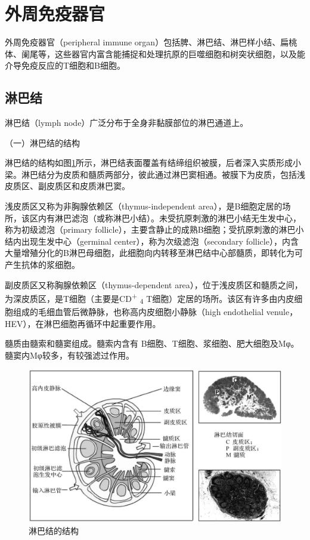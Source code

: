 \section{外周免疫器官}

外周免疫器官（peripheral immune
organ）包括脾、淋巴结、淋巴样小结、扁桃体、阑尾等，这些器官内富含能捕捉和处理抗原的巨噬细胞和树突状细胞，以及能介导免疫反应的T细胞和B细胞。


\subsection{淋巴结}

淋巴结（lymph node）广泛分布于全身非黏膜部位的淋巴通道上。

（一）淋巴结的结构

淋巴结的结构如图\ref{fig2-8}所示，淋巴结表面覆盖有结缔组织被膜，后者深入实质形成小梁。淋巴结分为皮质和髓质两部分，彼此通过淋巴窦相通。被膜下为皮质，包括浅皮质区、副皮质区和皮质淋巴窦。

浅皮质区又称为非胸腺依赖区（thymus-independent
area），是B细胞定居的场所，该区内有淋巴滤泡（或称淋巴小结）。未受抗原刺激的淋巴小结无生发中心，称为初级滤泡（primary
follicle），主要含静止的成熟B细胞；受抗原刺激的淋巴小结内出现生发中心（germinal
center），称为次级滤泡（secondary
follicle），内含大量增殖分化的B淋巴母细胞，此细胞向内转移至淋巴结中心部髓质，即转化为可产生抗体的浆细胞。

副皮质区又称胸腺依赖区（thymus-dependent
area），位于浅皮质区和髓质之间，为深皮质区，是T细胞（主要是CD\textsuperscript{+}
\textsubscript{4}
T细胞）定居的场所。该区有许多由内皮细胞组成的毛细血管后微静脉，也称高内皮细胞小静脉（high
endothelial venule，HEV），在淋巴细胞再循环中起重要作用。

髓质由髓索和髓窦组成。髓索内含有
B细胞、T细胞、浆细胞、肥大细胞及Mφ。髓窦内Mφ较多，有较强滤过作用。

\begin{figure}[!htbp]
 \centering
 \includegraphics[width=.6\textwidth]{./images/Image00033.jpg}
 \caption{淋巴结的结构}
 \label{fig2-8}
  \end{figure} 

